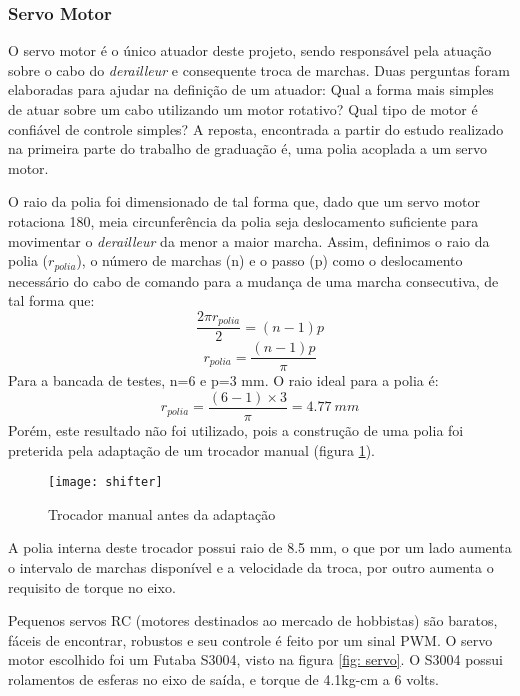 \documentclass[a4paper,11pt]{article}
\begin{document}
\subsubsection{Servo Motor}
\label{sec:servo}
O servo motor é o único atuador deste projeto, sendo responsável pela atuação
sobre o cabo do \textit{derailleur} e consequente troca de marchas. Duas
perguntas foram elaboradas para ajudar na definição de um atuador: Qual a
forma mais simples de atuar sobre um cabo utilizando um motor rotativo? Qual
tipo de motor é confiável de controle simples? A reposta, encontrada a partir
do estudo realizado na primeira parte do trabalho de graduação é, uma polia
acoplada a um servo motor.

O raio da polia foi dimensionado de tal forma que, dado que um servo motor
rotaciona 180\textdegree, meia circunferência da polia seja deslocamento
suficiente para movimentar o \textit{derailleur} da menor a maior marcha.
Assim, definimos o raio da polia ($r_{polia}$), o número de marchas (n) e o
passo (p) como o deslocamento necessário do cabo de comando para a mudança de
uma marcha consecutiva, de tal forma que:
\begin{equation*}
  \frac{\displaystyle 2\pi r_{polia} }{\displaystyle 2} = (n-1)p
\end{equation*}
\begin{equation}
  r_{polia} = \frac{\displaystyle (n-1)p}{\displaystyle \pi}
\end{equation}
Para a bancada de testes, n=6 e p=3 mm. O raio ideal para a polia é:
\begin{equation}
 r_{polia} = \frac{\displaystyle (6-1)\times 3}{\displaystyle \pi} = 4.77~mm
\end{equation}
Porém, este resultado não foi utilizado, pois a construção de uma polia foi
preterida pela adaptação de um trocador manual (figura \ref{fig:shifter}).
\begin{figure}[h!]
\begin{center}
 \texttt{[image: shifter]}
\end{center}
  \caption{Trocador manual antes da adaptação}
  \label{fig:shifter}
\end{figure}

A polia interna deste trocador possui raio de 8.5 mm, o que por um lado aumenta
o intervalo de marchas disponível e a velocidade da troca, por outro aumenta o
requisito de torque no eixo.

Pequenos servos RC (motores destinados ao mercado de hobbistas) são baratos,
fáceis de encontrar, robustos e seu controle é feito por um sinal PWM. O
servo motor escolhido foi um Futaba S3004, visto na figura \ref{fig:
servo}. O S3004 possui rolamentos de esferas no eixo de saída, e torque de
4.1kg-cm a 6 volts.
\end{document}
